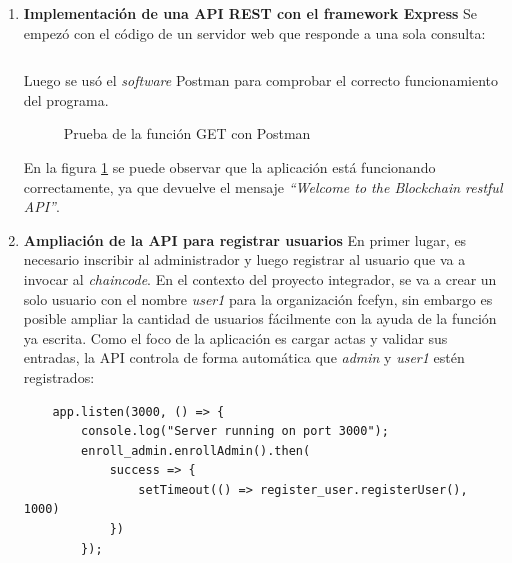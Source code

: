 \begin{enumerate}
    \item \textbf{Implementación de una API REST con el framework Express}\newline
    Se empezó con el código de un servidor web que responde a una sola consulta:
    \inputminted[linenos, breakanywhere=true, breaklines, bgcolor=mygray]{js}{Listings/example.js}
    Luego se usó el \textit{software} Postman para comprobar el correcto funcionamiento del programa.
    \begin{figure}[H]
        \caption{Prueba de la función GET con Postman}
        \label{fig:postman_first}
    \end{figure}
    En la figura \ref{fig:postman_first} se puede observar que la aplicación está funcionando correctamente, ya que devuelve el mensaje \textit{``Welcome to the Blockchain restful API''}.
    \item \textbf{Ampliación de la API para registrar usuarios}\newline
    En primer lugar, es necesario inscribir al administrador y luego registrar al usuario que va a invocar al \textit{chaincode}. En el contexto del proyecto integrador, se va a crear un solo usuario con el nombre \textit{user1} para la organización fcefyn, sin embargo es posible ampliar la cantidad de usuarios fácilmente con la ayuda de la función ya escrita.
    Como el foco de la aplicación es cargar actas y validar sus entradas, la API controla de forma automática que \textit{admin} y \textit{user1} estén registrados:
    \begin{verbatim}
    app.listen(3000, () => {
        console.log("Server running on port 3000");
        enroll_admin.enrollAdmin().then(
            success => {
                setTimeout(() => register_user.registerUser(), 1000)
            })
        });
    \end{verbatim}
\end{enumerate}
